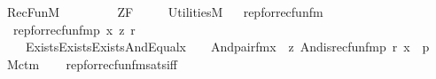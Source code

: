%
\begin{isabellebody}%
%
%
\isadelimtheory
%
\endisadelimtheory
%
\isatagtheory
{}\isamarkupfalse%
\ RecFun{\isacharunderscore}{\kern0pt}M\ \isanewline
\ \ \ \isanewline
\ \ \ \ ZF\ \isanewline
\ \ \ \ Utilities{\isacharunderscore}{\kern0pt}M\isanewline
{}%
\endisatagtheory
{\isafoldtheory}%
%
\isadelimtheory
\ \isanewline
%
\endisadelimtheory
\isanewline
{}\isamarkupfalse%
\ rep{\isacharunderscore}{\kern0pt}for{\isacharunderscore}{\kern0pt}recfun{\isacharunderscore}{\kern0pt}fm\ \ \isanewline
\ \ {\isachardoublequoteopen}rep{\isacharunderscore}{\kern0pt}for{\isacharunderscore}{\kern0pt}recfun{\isacharunderscore}{\kern0pt}fm{\isacharparenleft}{\kern0pt}p{\isacharcomma}{\kern0pt}\ x{\isacharcomma}{\kern0pt}\ z{\isacharcomma}{\kern0pt}\ r{\isacharparenright}{\kern0pt}\ {\isasymequiv}\ \isanewline
\ \ \ \ Exists{\isacharparenleft}{\kern0pt}Exists{\isacharparenleft}{\kern0pt}Exists{\isacharparenleft}{\kern0pt}And{\isacharparenleft}{\kern0pt}Equal{\isacharparenleft}{\kern0pt}x\ {\isacharhash}{\kern0pt}{\isacharplus}{\kern0pt}\ {}{\isacharcomma}{\kern0pt}\ {}{\isacharparenright}{\kern0pt}{\isacharcomma}{\kern0pt}\ And{\isacharparenleft}{\kern0pt}pair{\isacharunderscore}{\kern0pt}fm{\isacharparenleft}{\kern0pt}x{\isacharhash}{\kern0pt}{\isacharplus}{\kern0pt}{}{\isacharcomma}{\kern0pt}\ {}{\isacharcomma}{\kern0pt}\ z{\isacharhash}{\kern0pt}{\isacharplus}{\kern0pt}{}{\isacharparenright}{\kern0pt}{\isacharcomma}{\kern0pt}\ And{\isacharparenleft}{\kern0pt}is{\isacharunderscore}{\kern0pt}recfun{\isacharunderscore}{\kern0pt}fm{\isacharparenleft}{\kern0pt}p{\isacharcomma}{\kern0pt}\ r{\isacharhash}{\kern0pt}{\isacharplus}{\kern0pt}{}{\isacharcomma}{\kern0pt}\ x{\isacharhash}{\kern0pt}{\isacharplus}{\kern0pt}{}{\isacharcomma}{\kern0pt}\ {}{\isacharparenright}{\kern0pt}{\isacharcomma}{\kern0pt}\ p{\isacharparenright}{\kern0pt}{\isacharparenright}{\kern0pt}{\isacharparenright}{\kern0pt}{\isacharparenright}{\kern0pt}{\isacharparenright}{\kern0pt}{\isacharparenright}{\kern0pt}{\isachardoublequoteclose}\ \isanewline
\isanewline
{}\isamarkupfalse%
\ M{\isacharunderscore}{\kern0pt}ctm\ \isanewline
{}\ \isanewline
\isanewline
{}\isamarkupfalse%
\ rep{\isacharunderscore}{\kern0pt}for{\isacharunderscore}{\kern0pt}recfun{\isacharunderscore}{\kern0pt}fm{\isacharunderscore}{\kern0pt}sats{\isacharunderscore}{\kern0pt}iff\ {\isacharcolon}{\kern0pt}\isanewline

\end{isabellebody}
